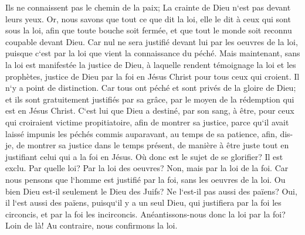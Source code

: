 \verse Ils ne connaissent pas le chemin de la paix; 
\verse La crainte de Dieu n`est pas devant leurs yeux. 
\verse Or, nous savons que tout ce que dit la loi, elle le dit à ceux qui sont sous la loi, afin que toute bouche soit fermée, et que tout le monde soit reconnu coupable devant Dieu. 
\verse Car nul ne sera justifié devant lui par les oeuvres de la loi, puisque c`est par la loi que vient la connaissance du péché. 
\verse Mais maintenant, sans la loi est manifestée la justice de Dieu, à laquelle rendent témoignage la loi et les prophètes, 
\verse justice de Dieu par la foi en Jésus Christ pour tous ceux qui croient. Il n`y a point de distinction. 
\verse Car tous ont péché et sont privés de la gloire de Dieu; 
\verse et ils sont gratuitement justifiés par sa grâce, par le moyen de la rédemption qui est en Jésus Christ. 
\verse C`est lui que Dieu a destiné, par son sang, à être, pour ceux qui croiraient victime propitiatoire, afin de montrer sa justice, parce qu`il avait laissé impunis les péchés commis auparavant, au temps de sa patience, afin, dis-je, 
\verse de montrer sa justice dans le temps présent, de manière à être juste tout en justifiant celui qui a la foi en Jésus. 
\verse Où donc est le sujet de se glorifier? Il est exclu. Par quelle loi? Par la loi des oeuvres? Non, mais par la loi de la foi. 
\verse Car nous pensons que l`homme est justifié par la foi, sans les oeuvres de la loi. 
\verse Ou bien Dieu est-il seulement le Dieu des Juifs? Ne l`est-il pas aussi des païens? Oui, il l`est aussi des païens, 
\verse puisqu`il y a un seul Dieu, qui justifiera par la foi les circoncis, et par la foi les incirconcis. 
\verse Anéantissons-nous donc la loi par la foi? Loin de là! Au contraire, nous confirmons la loi. 

